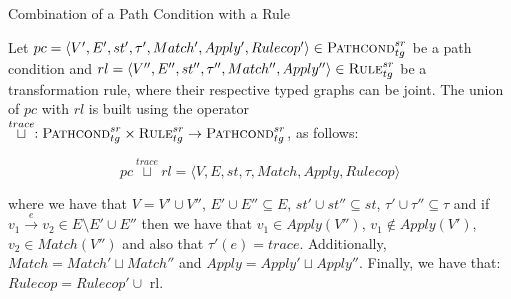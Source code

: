 \begin{definition}{Combination of a Path Condition with a Rule}
\label{def:combine_pc_with_rule}

  
Let $pc = \langle V',E',st',\tau',Match',Apply',Rulecop'\rangle\in\\
\textsc{Pathcond}^{sr}_{tg}$ be a path condition and $rl = \langle
V'',E'',st'',\tau'',\\Match'',Apply''\rangle\in \textsc{Rule}^{sr}_{tg}$ be a transformation rule, where their respective typed graphs can be joint. The union of $pc$ with $rl$ is built using the operator $\stackrel{trace}{\sqcup}:
\textsc{Pathcond}^{sr}_{tg}\times \textsc{Rule}^{sr}_{tg}\rightarrow
\textsc{Pathcond}^{sr}_{tg}$, as follows:

$$pc\stackrel{trace}{\sqcup}rl = \langle V,E,st,\tau,Match,Apply,Rulecop\rangle$$

where we have that $V=V'\cup V''$, $E'\cup E''\subseteq E$, $st'\cup
st''\subseteq st$, $\tau'\cup \tau''\subseteq \tau$ and if $v_1\xrightarrow{e}
v_2\in E\setminus E'\cup E''$ then we have that $v_1\in Apply(V'')$, $v_1\notin Apply(V')$, $v_2\in Match(V'')$ and also that $\tau'(e)=trace$. Additionally, $Match = Match'\sqcup Match''$ and $Apply = Apply'\sqcup Apply''$. Finally, we have that: $Rulecop = Rulecop'\cup$ {rl}.


% 
\end{definition}

